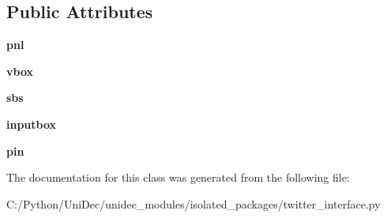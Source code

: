 \subsection*{Public Attributes}
\begin{DoxyCompactItemize}
\item 
\hypertarget{class_uni_dec_1_1unidec__modules_1_1isolated__packages_1_1twitter__interface_1_1_pin_window_ad4879949ab25251a53b7b6ceb2fb8109}{}{\bfseries pnl}\label{class_uni_dec_1_1unidec__modules_1_1isolated__packages_1_1twitter__interface_1_1_pin_window_ad4879949ab25251a53b7b6ceb2fb8109}

\item 
\hypertarget{class_uni_dec_1_1unidec__modules_1_1isolated__packages_1_1twitter__interface_1_1_pin_window_a2627bc2b7eff1c2be0889adf41bb79ca}{}{\bfseries vbox}\label{class_uni_dec_1_1unidec__modules_1_1isolated__packages_1_1twitter__interface_1_1_pin_window_a2627bc2b7eff1c2be0889adf41bb79ca}

\item 
\hypertarget{class_uni_dec_1_1unidec__modules_1_1isolated__packages_1_1twitter__interface_1_1_pin_window_a758e7e95fa12b676ba5a25ca1f153c25}{}{\bfseries sbs}\label{class_uni_dec_1_1unidec__modules_1_1isolated__packages_1_1twitter__interface_1_1_pin_window_a758e7e95fa12b676ba5a25ca1f153c25}

\item 
\hypertarget{class_uni_dec_1_1unidec__modules_1_1isolated__packages_1_1twitter__interface_1_1_pin_window_a2f7254c1b45f690faffa9620ff87c5dc}{}{\bfseries inputbox}\label{class_uni_dec_1_1unidec__modules_1_1isolated__packages_1_1twitter__interface_1_1_pin_window_a2f7254c1b45f690faffa9620ff87c5dc}

\item 
\hypertarget{class_uni_dec_1_1unidec__modules_1_1isolated__packages_1_1twitter__interface_1_1_pin_window_a1f3295774389dd2ffd3dcf55337bdac4}{}{\bfseries pin}\label{class_uni_dec_1_1unidec__modules_1_1isolated__packages_1_1twitter__interface_1_1_pin_window_a1f3295774389dd2ffd3dcf55337bdac4}

\end{DoxyCompactItemize}


The documentation for this class was generated from the following file\+:\begin{DoxyCompactItemize}
\item 
C\+:/\+Python/\+Uni\+Dec/unidec\+\_\+modules/isolated\+\_\+packages/twitter\+\_\+interface.\+py\end{DoxyCompactItemize}
